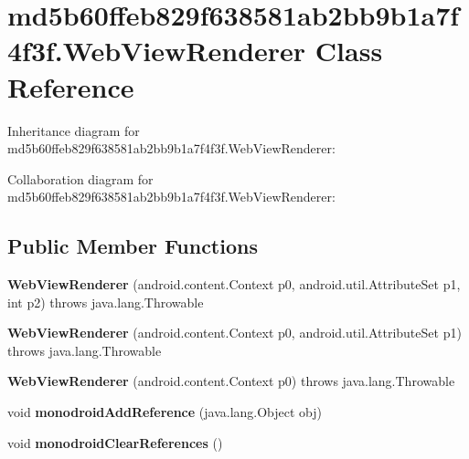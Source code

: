 \hypertarget{classmd5b60ffeb829f638581ab2bb9b1a7f4f3f_1_1_web_view_renderer}{}\section{md5b60ffeb829f638581ab2bb9b1a7f4f3f.\+Web\+View\+Renderer Class Reference}
\label{classmd5b60ffeb829f638581ab2bb9b1a7f4f3f_1_1_web_view_renderer}


Inheritance diagram for md5b60ffeb829f638581ab2bb9b1a7f4f3f.\+Web\+View\+Renderer\+:


Collaboration diagram for md5b60ffeb829f638581ab2bb9b1a7f4f3f.\+Web\+View\+Renderer\+:
\subsection*{Public Member Functions}
\begin{DoxyCompactItemize}
\item 
\mbox{\label{classmd5b60ffeb829f638581ab2bb9b1a7f4f3f_1_1_web_view_renderer_aefd07d6eeb7a2a7eba83ec8f30ddf5a0}} 
{\bfseries Web\+View\+Renderer} (android.\+content.\+Context p0, android.\+util.\+Attribute\+Set p1, int p2)  throws java.\+lang.\+Throwable 	
\item 
\mbox{\label{classmd5b60ffeb829f638581ab2bb9b1a7f4f3f_1_1_web_view_renderer_a5d31cef44bb6ebaec7f75139c55577ac}} 
{\bfseries Web\+View\+Renderer} (android.\+content.\+Context p0, android.\+util.\+Attribute\+Set p1)  throws java.\+lang.\+Throwable 	
\item 
\mbox{\label{classmd5b60ffeb829f638581ab2bb9b1a7f4f3f_1_1_web_view_renderer_ad389d22a1a6485d39e52a0d587ca519b}} 
{\bfseries Web\+View\+Renderer} (android.\+content.\+Context p0)  throws java.\+lang.\+Throwable 	
\item 
\mbox{\label{classmd5b60ffeb829f638581ab2bb9b1a7f4f3f_1_1_web_view_renderer_a395da0b1470b8a8d7fe3d8f11678dd44}} 
void {\bfseries monodroid\+Add\+Reference} (java.\+lang.\+Object obj)
\item 
\mbox{\label{classmd5b60ffeb829f638581ab2bb9b1a7f4f3f_1_1_web_view_renderer_a554c17e18aeffc2dcd3b9899551fd449}} 
void {\bfseries monodroid\+Clear\+References} ()
\end{DoxyCompactItemize}

